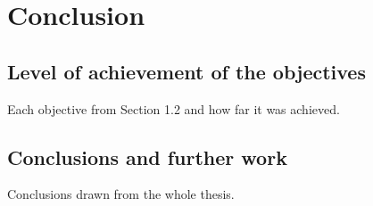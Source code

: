 \chapter{Conclusion}

\section{Level of achievement of the objectives}
Each objective from Section 1.2 and how far it was achieved.

\section{Conclusions and further work}
Conclusions drawn from the whole thesis.
